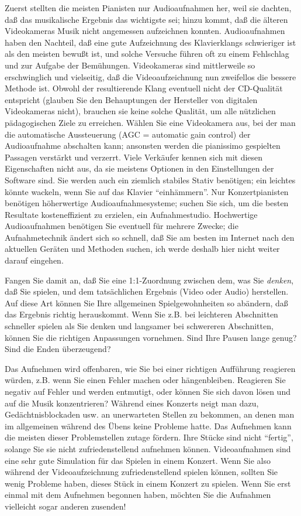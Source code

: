 Zuerst stellten die meisten Pianisten nur Audioaufnahmen her, weil sie dachten, daß das musikalische Ergebnis das wichtigste sei; hinzu kommt, daß die älteren Videokameras Musik nicht angemessen aufzeichnen konnten.
Audioaufnahmen haben den Nachteil, daß eine gute Aufzeichnung des Klavierklangs schwieriger ist als den meisten bewußt ist, und solche Versuche führen oft zu einem Fehlschlag und zur Aufgabe der Bemühungen.
Videokameras sind mittlerweile so erschwinglich und vielseitig, daß die Videoaufzeichnung nun zweifellos die bessere Methode ist.
Obwohl der resultierende Klang eventuell nicht der CD-Qualität entspricht (glauben Sie den Behauptungen der Hersteller von digitalen Videokameras nicht), brauchen sie keine solche Qualität, um alle nützlichen pädagogischen Ziele zu erreichen.
Wählen Sie eine Videokamera aus, bei der man die automatische Aussteuerung (AGC = automatic gain control) der Audioaufnahme abschalten kann; ansonsten werden die pianissimo gespielten Passagen verstärkt und verzerrt.
Viele Verkäufer kennen sich mit diesen Eigenschaften nicht aus, da sie meistens Optionen in den Einstellungen der Software sind.
Sie werden auch ein ziemlich stabiles Stativ benötigen; ein leichtes könnte wackeln, wenn Sie auf das Klavier \enquote{einhämmern}.
Nur Konzertpianisten benötigen höherwertige Audioaufnahmesysteme; suchen Sie sich, um die besten Resultate kosteneffizient zu erzielen, ein Aufnahmestudio. 
Hochwertige Audioaufnahmen benötigen Sie eventuell für mehrere Zwecke; die Aufnahmetechnik ändert sich so schnell, daß Sie am besten im Internet nach den aktuellen Geräten und Methoden suchen, ich werde deshalb hier nicht weiter darauf eingehen.

Fangen Sie damit an, daß Sie eine 1:1-Zuordnung zwischen dem, was Sie \textit{denken}, daß Sie spielen, und dem tatsächlichen Ergebnis (Video oder Audio) herstellen.
Auf diese Art können Sie Ihre allgemeinen Spielgewohnheiten so abändern, daß das Ergebnis richtig herauskommt.
Wenn Sie z.B. bei leichteren Abschnitten schneller spielen als Sie denken und langsamer bei schwereren Abschnitten, können Sie die richtigen Anpassungen vornehmen.
Sind Ihre Pausen lange genug?
Sind die Enden überzeugend?

Das Aufnehmen wird offenbaren, wie Sie bei einer richtigen Aufführung reagieren würden, z.B. wenn Sie einen Fehler machen oder hängenbleiben.
Reagieren Sie negativ auf Fehler und werden entmutigt, oder können Sie sich davon lösen und auf die Musik konzentrieren?
Während eines Konzerts neigt man dazu, Gedächtnisblockaden usw. an unerwarteten Stellen zu bekommen, an denen man im allgemeinen während des Übens keine Probleme hatte.
Das Aufnehmen kann die meisten dieser Problemstellen zutage fördern.
Ihre Stücke sind nicht \enquote{fertig}, solange Sie sie nicht zufriedenstellend aufnehmen können.
Videoaufnahmen sind eine sehr gute Simulation für das Spielen in einem Konzert.
Wenn Sie also während der Videoaufzeichnung zufriedenstellend spielen können, sollten Sie wenig Probleme haben, dieses Stück in einem Konzert zu spielen.
Wenn Sie erst einmal mit dem Aufnehmen begonnen haben, möchten Sie die Aufnahmen vielleicht sogar anderen zusenden!

